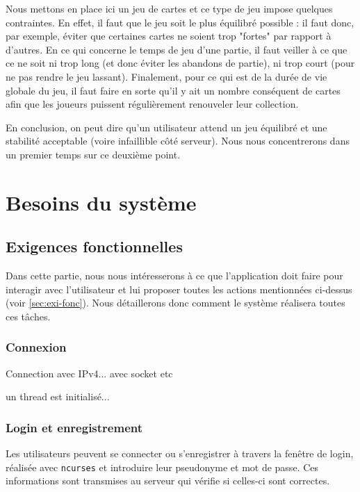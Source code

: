 \documentclass[11pt,a4paper]{article}
\begin{document}
\medbreak

Nous mettons en place ici un jeu de cartes et ce type de jeu impose quelques contraintes.  En effet, il faut que le jeu soit le plus équilibré possible : il faut donc, par exemple, éviter que certaines cartes ne soient trop "fortes" par rapport à d'autres.  En ce qui concerne le temps de jeu d'une partie, il faut veiller à ce que ce ne soit ni trop long (et donc éviter les abandons de partie), ni trop court (pour ne pas rendre le jeu lassant). Finalement, pour ce qui est de la durée de vie globale du jeu, il faut faire en sorte qu'il y ait un nombre conséquent de cartes afin que les joueurs puissent régulièrement renouveler leur collection.

\medbreak

En conclusion, on peut dire qu'un utilisateur attend un jeu équilibré et une stabilité acceptable (voire infaillible côté serveur).  Nous nous concentrerons dans un premier temps sur ce deuxième point.



\section{Besoins du système}
\label{sec:besoins-sys}

\subsection{Exigences fonctionnelles}
\label{sec:exi-fonc-sys}

Dans cette partie, nous nous intéresserons à ce que l'application doit
faire pour interagir avec l'utilisateur et lui proposer toutes les
actions mentionnées ci-dessus (voir \ref{sec:exi-fonc}). Nous détaillerons
donc comment le système réalisera toutes ces tâches.

\subsubsection*{Connexion}

Connection avec IPv4... avec socket etc

un thread est initialisé...

\subsubsection*{Login et enregistrement}

Les utilisateurs peuvent se connecter ou s'enregistrer à travers la
fenêtre de login, réalisée avec \texttt{ncurses} et introduire leur
pseudonyme et mot de passe. Ces informations sont transmises au serveur
qui vérifie si celles-ci sont correctes.
\end{document}
